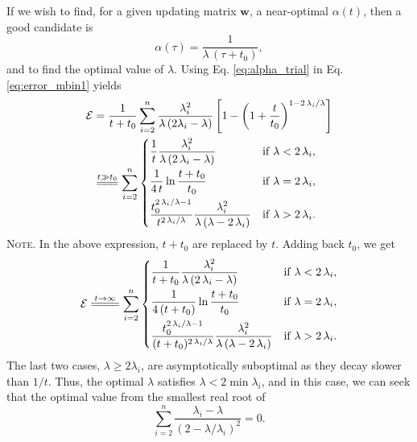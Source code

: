 \documentclass[reprint]{revtex4-1}
\newcommand{\note}[1]{{\color{DarkGreen}\footnotesize \textsc{Note.} #1}}
\begin{document}
If we wish to find,
for a given updating matrix $\mathbf w$,
a near-optimal $\alpha(t)$,
%
then a good candidate is
%
\begin{equation}
\alpha(\tau) = \frac{1}{\lambda \, (\tau + t_0) },
\label{eq:alpha_trial}
\end{equation}
%
and to find the optimal value of $\lambda$.
%
Using Eq. \eqref{eq:alpha_trial}
in Eq. \eqref{eq:error_mbin1} yields
%
\begin{align}
\mathcal E
&=
\frac{1}{t+t_0}
\sum_{i=2}^n \frac{ \lambda_i^2 } { \lambda \, (2 \lambda_i - \lambda) }
\left[
  1 - \left(
    1 + \frac{t}{t_0}
  \right)^{1 - 2 \, \lambda_i/\lambda}
\right]
\notag
\\
&\stackrel{      t \gg t_0      }
          { =\joinrel=\joinrel= }
%
\sum_{i = 2}^n
\begin{dcases}
  \frac{ 1 }
       { t }
  \frac{ \lambda_i^2 }
       { \lambda \, (2 \, \lambda_i - \lambda) }
  &
  \mathrm{if \;} \lambda < 2 \, \lambda_i,
  \\%
  \frac{   1    }
       { 4 \, t }
  \ln \frac{ t + t_0 }
           {  t_0    }
  &
  \mathrm{if \;} \lambda = 2 \, \lambda_i,
  \\%
  \frac{ t_0^{ 2 \, \lambda_i / \lambda  - 1} }
       { t^{ 2 \, \lambda_i / \lambda } }
  \frac{ \lambda_i^2 }
       { \lambda \, (\lambda - 2 \, \lambda_i) }
  &
  \mathrm{if \;} \lambda > 2 \, \lambda_i.
\end{dcases}
\label{eq:y2_sum_perfect_invt}
\end{align}
%
\note{In the above expression,
$t + t_0$ are replaced by $t$.
%
Adding back $t_0$, we get
$$
\begin{aligned}
  \mathcal E
  \stackrel{         t \to \infty         }
           { =\joinrel=\joinrel=\joinrel= }
  \sum_{i = 2}^n
  \begin{dcases}
    \frac{ 1 }{ t + t_0 }
    \frac{ \lambda_i^2 } { \lambda \, (2 \, \lambda_i - \lambda) }
    &
    \mathrm{if \;} \lambda < 2 \, \lambda_i,
    \\%
    \frac{1}{4 \, (t + t_0) } \ln\frac{t + t_0}{t_0}
    &
    \mathrm{if \;} \lambda = 2 \, \lambda_i,
    \\
    \frac{ t_0^{ 2 \, \lambda_i / \lambda  - 1} }
         { (t + t_0)^{ 2 \, \lambda_i / \lambda } }
    \frac{ \lambda_i^2 }
         { \lambda \, (\lambda - 2 \, \lambda_i) }
    &
    \mathrm{if \;} \lambda > 2 \, \lambda_i.
  \end{dcases}
\end{aligned}
$$
}
%
The last two cases, $\lambda \ge 2\lambda_i$,
are asymptotically suboptimal
as they decay slower than $1/t$.
%
Thus, the optimal $\lambda$
satisfies $\lambda < 2 \min \lambda_i$,
and in this case,
we can seek that
the optimal value from
the smallest real root of
%
\begin{equation}
\sum_{i = 2}^n
\frac{ \lambda_i - \lambda }
{ \left(2 - \lambda/ \lambda_i \right)^2 }
= 0.
\label{eq:optimal_lambda_approx}
\end{equation}
\end{document}
